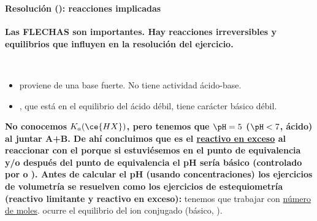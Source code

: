 \begin{frame}
	\frametitle{\ejerciciocmd}
	\framesubtitle{Resolución (): reacciones implicadas}
	\alert{\textbf{Las FLECHAS son importantes. Hay reacciones irreversibles y equilibrios que influyen en la resolución del ejercicio.}}
	\\
	\begin{center}
	\end{center}
	\\
	\begin{center}
	\end{center}
	\begin{center}
	\end{center}
	\begin{itemize}
		\item{} proviene de una base fuerte. No tiene actividad ácido-base.
		\item{}, que está en el equilibrio del ácido débil, tiene carácter básico débil.
	\end{itemize}
	\alert{\textbf{No conocemos $K_a(\ce{HX})$, pero tenemos que $\pH = 5$ ($\pH < 7$, ácido) al juntar A+B. De ahí concluimos que  es el \underline{reactivo en exceso} al reaccionar con el  porque si estuviésemos en el punto de equivalencia y/o después del punto de equivalencia el pH sería básico (controlado por  o ). Antes de calcular el pH (usando concentraciones) los ejercicios de volumetría se resuelven como los ejercicios de estequiometría (reactivo limitante y reactivo en exceso):}} tenemos que trabajar con \underline{número de moles}.
	 ocurre el equilibrio del ion conjugado (básico, ).
	\begin{center}
	\end{center}
\end{frame}

